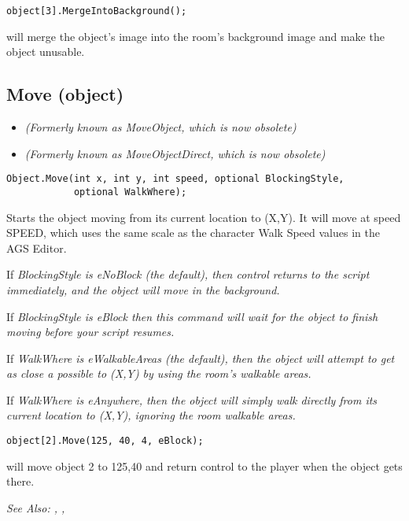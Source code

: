 \begin{verbatim}
object[3].MergeIntoBackground();
\end{verbatim}
will merge the object's image into the room's background image and make the object unusable.


\subsection{Move (object)}\label{Object.Move}%

\begin{itemize}
\item \it{(Formerly known as MoveObject, which is now obsolete)}
\item \it{(Formerly known as MoveObjectDirect, which is now obsolete)}
\end{itemize}

\begin{verbatim}
Object.Move(int x, int y, int speed, optional BlockingStyle,
            optional WalkWhere);
\end{verbatim}
Starts the object moving from its current location to (X,Y). It will
move at speed SPEED, which uses the same scale as the character Walk Speed
values in the AGS Editor.

If \it{BlockingStyle} is eNoBlock (the default), then control returns to the script
immediately, and the object will move in the background.

If \it{BlockingStyle} is eBlock then this command will wait for the object
to finish moving before your script resumes.

If \it{WalkWhere} is eWalkableAreas (the default), then the object will attempt to
get as close a possible to (X,Y) by using the room's walkable areas.

If \it{WalkWhere} is eAnywhere, then the object will simply walk directly from its
current location to (X,Y), ignoring the room walkable areas.

\begin{verbatim}
object[2].Move(125, 40, 4, eBlock);
\end{verbatim}
will move object 2 to 125,40 and return control to the player when the object gets there.

\it{See Also:} , ,



